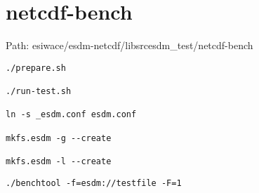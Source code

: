 \chapter{netcdf-bench}

Path: esiwace/esdm-netcdf/libsrcesdm\_test/netcdf-bench

\begin{verbatim}
./prepare.sh

./run-test.sh

ln -s _esdm.conf esdm.conf

mkfs.esdm -g --create

mkfs.esdm -l --create
\end{verbatim}

\begin{verbatim}
./benchtool -f=esdm://testfile -F=1


\end{verbatim}
